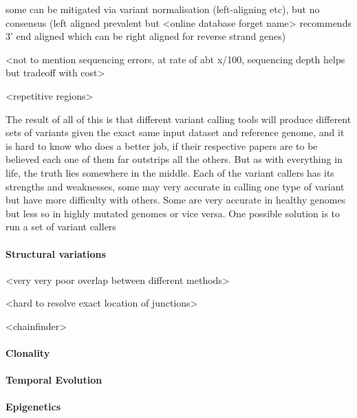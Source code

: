 some can be mitigated via variant normalisation (left-aligning etc), but no consensus (left aligned prevalent but <online database forget name> recommends 3' end aligned which can be right aligned for reverse strand genes)

<not to mention sequencing errors, at rate of abt x/100, sequencing depth helps but tradeoff with cost>

<repetitive regions>

The result of all of this is that different variant calling tools will produce different sets of variants given the exact same input dataset and reference genome, and it is hard to know who does a better job, if their respective papers are to be believed each one of them far outstrips all the others. But as with everything in life, the truth lies somewhere in the middle. Each of the variant callers has its strengths and weaknesses, some may very accurate in calling one type of variant but have  more difficulty with others. Some are very accurate in healthy genomes but less so in highly mutated genomes or vice versa. One possible solution is to run a set of variant callers

\paragraph{Structural variations}
<very very poor overlap between different methods>

<hard to resolve exact location of junctions>

<chainfinder>
\paragraph{Clonality}
\paragraph{Temporal Evolution}
\paragraph{Epigenetics}



